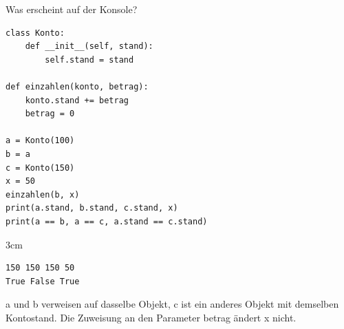 \question[4]
Was erscheint auf der Konsole?
\begin{lstlisting}
class Konto:
    def __init__(self, stand):
        self.stand = stand

def einzahlen(konto, betrag):
    konto.stand += betrag
    betrag = 0

a = Konto(100)
b = a
c = Konto(150)
x = 50
einzahlen(b, x)
print(a.stand, b.stand, c.stand, x)
print(a == b, a == c, a.stand == c.stand)
\end{lstlisting}
\begin{solutionbox}{3cm}
\begin{lstlisting}[language={}]
150 150 150 50
True False True
\end{lstlisting}
a und b verweisen auf dasselbe Objekt, c ist ein anderes Objekt mit demselben Kontostand.
Die Zuweisung an den Parameter betrag ändert x nicht.
\end{solutionbox}
